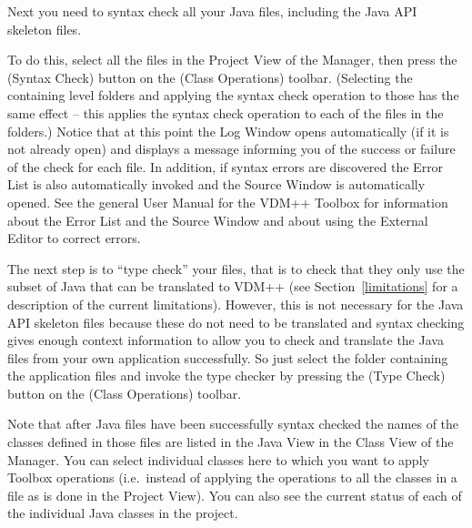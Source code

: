 \documentclass[\pformat,12pt]{article}
\newcommand{\guicmd}[1]{{\sf #1}}
\begin{document}
Next you need to syntax check all your Java files, including the Java
API skeleton files. 

To do this, select all the files in the \guicmd{Project View} 
of the \guicmd{Manager}, then press the 
(\guicmd{Syntax Check}) button on the (\guicmd{Class Operations})
toolbar. (Selecting the containing level folders and
applying the syntax check operation to those  has the same effect --
this applies the syntax check operation to each of the  files in the folders.) 
Notice that at this point the \guicmd{Log Window} opens automatically
(if it is not already open) and displays a message informing you of
the success or failure of the check for each file. In addition, if
syntax errors are discovered the \guicmd{Error List} is
also au\-to\-matically invoked and the \guicmd{Source Window} is
automatically opened. See the general User Manual for the VDM++
Toolbox \cite{UserManPP-SCSK} for information about the \guicmd{Error List}
and the \guicmd{Source Window} and about using the \guicmd{External
  Editor} to correct errors.

The next step is to ``type check'' your files, that is to check that
they only use the subset of Java 
that can be translated to VDM++ (see Section~\ref{limitations} for a
description of the current limitations). However, this is not
necessary for the Java API skeleton files because these do not need to
be translated and syntax checking gives enough context information to
allow you to check and translate the Java files from your own
application successfully. So just select the folder containing the
application files and invoke the type checker by pressing the 
(\guicmd{Type Check}) button on the (\guicmd{Class Operations})
toolbar. 

Note that after Java files have been successfully syntax checked the
names of the classes defined in those files are listed in the
\guicmd{Java View} in the \guicmd{Class View} of the
\guicmd{Manager}. You can select individual classes here to which you
want to apply Toolbox operations (i.e.\ instead of applying the
operations to all the classes in a file as is done in the
\guicmd{Project View}). You can also see the current status of each of
the individual Java classes in the project. 
\end{document}
